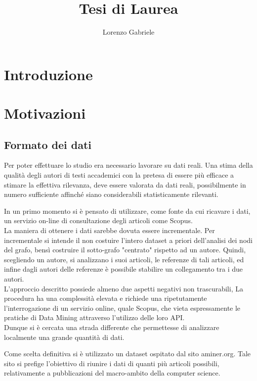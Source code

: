 \documentclass[a4paper,12pt]{article}
\title{Tesi di Laurea}
\author{Lorenzo Gabriele}
\let\oldsection\section
\renewcommand\section{\clearpage\oldsection}
\begin{document}
\maketitle
\clearpage
\tableofcontents
\clearpage

\section{Introduzione}

\section{Motivazioni}



\subsection{Formato dei dati}
Per poter effettuare lo studio era necessario lavorare su dati reali. Una stima della qualità degli autori di testi accademici con la pretesa di essere più efficace a stimare la effettiva rilevanza, deve essere valorata da dati reali, possibilmente in numero sufficiente affinché siano considerabili statisticamente rilevanti.
\par
In un primo momento si è pensato di utilizzare, come fonte da cui ricavare i dati, un servizio on-line di consultazione degli articoli come Scopus. \\ 
La maniera di ottenere i dati sarebbe dovuta essere incrementale.
Per incrementale si intende il non costuire l'intero dataset a priori dell'analisi dei nodi del grafo, bensì costruire il sotto-grafo "centrato" rispetto ad un autore.
Quindi, scegliendo un autore, si analizzano i suoi articoli, le referenze di tali articoli, ed infine dagli autori delle referenze è possibile stabilire un collegamento tra i due autori. \\
L'approccio descritto possiede almeno due aspetti negativi non trascurabili,
La procedura ha una complessità elevata e richiede una ripetutamente l'interrogazione di un servizio online, quale Scopus, che vieta espressamente le pratiche di Data Mining attraverso l'utilizzo delle loro API. \\
Dunque si è cercata una strada differente che permettesse di analizzare localmente una grande quantità di dati.
\par
Come scelta definitiva si è utilizzato un dataset ospitato dal sito aminer.org. Tale sito si prefige l'obiettivo di riunire i dati di quanti più articoli possibili, relativamente a pubblicazioni del macro-ambito della computer science. \\
\end{document}
